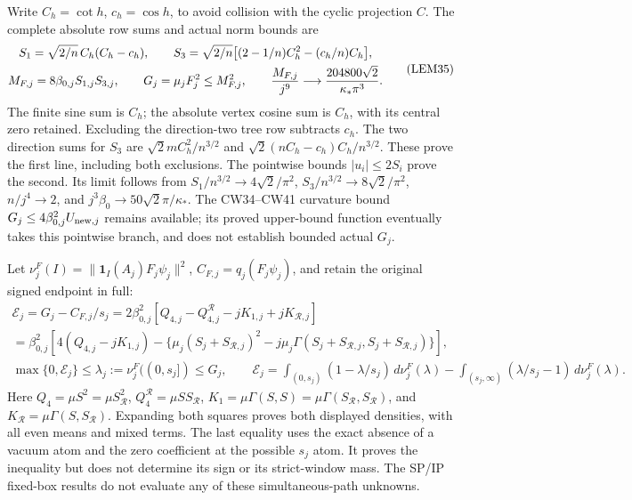 \documentclass[11pt]{article}
\begin{document}
Write \(C_h=\cot h\), \(c_h=\cos h\), to avoid collision with the cyclic projection \(C\). The complete absolute row sums and actual norm bounds are
\[
\begin{gathered}
S_1=\sqrt{2/n}\,C_h(C_h-c_h),\qquad
S_3=\sqrt{2/n}\big[(2-1/n)C_h^2-(c_h/n)C_h\big],\\
M_{F,j}=8\beta_{0,j}S_{1,j}S_{3,j},\qquad
G_j=\mu_jF_j^2\le M_{F,j}^2,\qquad
{M_{F,j}\over j^9}\longrightarrow
{204800\sqrt2\over\kappa_*\pi^3}.
\end{gathered}\tag{LEM35}
\]
The finite sine sum is \(C_h\); the absolute vertex cosine sum is \(C_h\), with its central zero retained. Excluding the direction-two tree row subtracts \(c_h\). The two direction sums for \(S_3\) are \(\sqrt2mC_h^2/n^{3/2}\) and \(\sqrt2(nC_h-c_h)C_h/n^{3/2}\). These prove the first line, including both exclusions. The pointwise bounds \(|u_i|\le2S_i\) prove the second. Its limit follows from \(S_1/n^{3/2}\to4\sqrt2/\pi^2\), \(S_3/n^{3/2}\to8\sqrt2/\pi^2\), \(n/j^4\to2\), and \(j^3\beta_0\to50\sqrt2\pi/\kappa_*\). The CW34–CW41 curvature bound \(G_j\le4\beta_{0,j}^2U_{{\rm new},j}\) remains available; its proved upper-bound function eventually takes this pointwise branch, and does not establish bounded actual \(G_j\).

Let \(\nu_j^F(I)=\|\mathbf1_I(A_j)F_j\psi_j\|^2\), \(C_{F,j}=q_j(F_j\psi_j)\), and retain the original signed endpoint in full:
\[
\begin{gathered}
\mathcal E_j=G_j-C_{F,j}/s_j
=2\beta_{0,j}^2[Q_{4,j}-Q_{4,j}^{\mathcal R}
                         -jK_{1,j}+jK_{\mathcal R,j}]\\
=\beta_{0,j}^2\left[
4(Q_{4,j}-jK_{1,j})
-\{\mu_j(S_j+S_{\mathcal R,j})^2
             -j\mu_j\Gamma(S_j+S_{\mathcal R,j},S_j+S_{\mathcal R,j})\}\right],\\
\max\{0,\mathcal E_j\}\le\lambda_j:=\nu_j^F((0,s_j])\le G_j,\qquad
\mathcal E_j=
\int_{(0,s_j)}(1-\lambda/s_j)\,d\nu_j^F(\lambda)
-\int_{(s_j,\infty)}(\lambda/s_j-1)\,d\nu_j^F(\lambda).
\end{gathered}\tag{LEM36}
\]
Here \(Q_4=\mu S^2=\mu S_{\mathcal R}^2\), \(Q_4^{\mathcal R}=\mu SS_{\mathcal R}\), \(K_1=\mu\Gamma(S,S)=\mu\Gamma(S_{\mathcal R},S_{\mathcal R})\), and \(K_{\mathcal R}=\mu\Gamma(S,S_{\mathcal R})\). Expanding both squares proves both displayed densities, with all even means and mixed terms. The last equality uses the exact absence of a vacuum atom and the zero coefficient at the possible \(s_j\) atom. It proves the inequality but does not determine its sign or its strict-window mass. The SP/IP fixed-box results do not evaluate any of these simultaneous-path unknowns.
\end{document}
